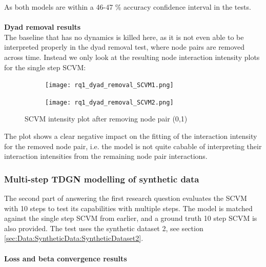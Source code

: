 \noindent
As both models are within a 46-47 \% accuracy confidence interval in the tests.
\\\\
\noindent
\textbf{Dyad removal results}
\\
\noindent
The baseline that has no dynamics is killed here, as it is not even able to be interpreted properly in the dyad removal test, where node pairs are removed across time. Instead we only look at the resulting node interaction intensity plots for the single step SCVM:
\begin{figure}[H]
    \centering
    \begin{subfigure}[b]{\textwidth}
        \centering
        \texttt{[image: rq1\_dyad\_removal\_SCVM1.png]}
    \end{subfigure}
    \hfill
    \begin{subfigure}[b]{\textwidth}
        \centering
        \texttt{[image: rq1\_dyad\_removal\_SCVM2.png]}
    \end{subfigure}
        \caption{SCVM intensity plot after removing node pair (0,1)}
    \label{fig:RQ1:SCVM_accuracy}
\end{figure}
\noindent
The plot shows a clear negative impact on the fitting of the interaction intensity for the removed node pair, i.e. the model is not quite cabable of interpreting their interaction intensities from the remaining node pair interactions.

\subsubsection{Multi-step TDGN modelling of synthetic data}
\label{sec:ResearchQuestion1:multiStepSynthetic}
The second part of answering the first research question evaluates the SCVM with 10 steps to test its capabilities with multiple steps. The model is matched against the single step SCVM from earlier, and a ground truth 10 step SCVM is also provided. 
The test uses the synthetic dataset 2, see section \ref{sec:Data:SyntheticData:SyntheticDataset2}.
\\\\
\textbf{Loss and beta convergence results}

